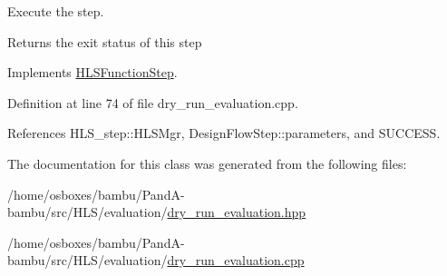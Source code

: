 Execute the step. 

\begin{DoxyReturn}{Returns}
the exit status of this step 
\end{DoxyReturn}


Implements \hyperlink{classHLSFunctionStep_a8db4c00d080655984d98143206fc9fa8}{H\+L\+S\+Function\+Step}.



Definition at line 74 of file dry\+\_\+run\+\_\+evaluation.\+cpp.



References H\+L\+S\+\_\+step\+::\+H\+L\+S\+Mgr, Design\+Flow\+Step\+::parameters, and S\+U\+C\+C\+E\+SS.



The documentation for this class was generated from the following files\+:\begin{DoxyCompactItemize}
\item 
/home/osboxes/bambu/\+Pand\+A-\/bambu/src/\+H\+L\+S/evaluation/\hyperlink{dry__run__evaluation_8hpp}{dry\+\_\+run\+\_\+evaluation.\+hpp}\item 
/home/osboxes/bambu/\+Pand\+A-\/bambu/src/\+H\+L\+S/evaluation/\hyperlink{dry__run__evaluation_8cpp}{dry\+\_\+run\+\_\+evaluation.\+cpp}\end{DoxyCompactItemize}

